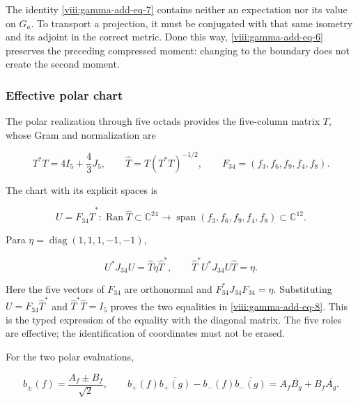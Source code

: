 The identity \eqref{viii:gamma-add-eq-7} contains neither an expectation nor its value on \(G_a\). To transport a projection, it must be conjugated with that same isometry and its adjoint in the correct metric. Done this way, \eqref{viii:gamma-add-eq-6} preserves the preceding compressed moment: changing to the boundary does not create the second moment.

\subsubsection{Effective polar chart}
\label{viii:gamma-add-sub-220}

The polar realization through five octads provides the five-column
matrix \(T\), whose Gram and normalization are

\begin{equation}
T^*T=4I_5+\frac43J_5,\qquad
\widehat T=T(T^*T)^{-1/2},\qquad
F_{34}=(f_3,f_6,f_9,f_4,f_8).
\label{viii:gamma-add-display-18}
\end{equation}

The chart with its explicit spaces is

\begin{equation}
U=F_{34}\widehat T^*:
\operatorname{Ran}\widehat T\subset\mathbb C^{24}
\longrightarrow\operatorname{span}(f_3,f_6,f_9,f_4,f_8)\subset\mathbb C^{12}.
\label{viii:gamma-add-display-19}
\end{equation}

Para \(\eta=\operatorname{diag}(1,1,1,-1,-1)\),

\begin{equation}
U^*J_{34}U=\widehat T\eta\widehat T^*,\qquad
\widehat T^*U^*J_{34}U\widehat T=\eta.
\label{viii:gamma-add-eq-8}
\end{equation}

Here the five vectors of \(F_{34}\) are orthonormal and
\(F_{34}^*J_{34}F_{34}=\eta\). Substituting
\(U=F_{34}\widehat T^*\) and \(\widehat T^*\widehat T=I_5\)
proves the two equalities in \eqref{viii:gamma-add-eq-8}.
This is the typed expression of the equality with the diagonal matrix.
The five roles are effective; the identification of coordinates must
not be erased.

For the two polar evaluations,

\begin{equation}
b_\pm(f)=\frac{A_f\pm B_f}{\sqrt2},\qquad
b_+(f)\overline{b_+(g)}-b_-(f)\overline{b_-(g)}
=A_f\overline{B_g}+B_f\overline{A_g}.
\label{viii:gamma-add-eq-9}
\end{equation}

